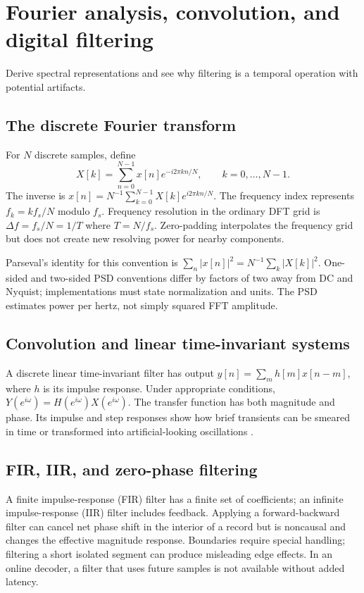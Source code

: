 \chapter{Fourier analysis, convolution, and digital filtering}\label{ch:fourier}
\begin{readergoal}Derive spectral representations and see why filtering is a temporal operation with potential artifacts.\end{readergoal}
\section{The discrete Fourier transform}
For $N$ discrete samples, define
\[X[k]=\sum_{n=0}^{N-1}x[n]e^{-i2\pi kn/N},\qquad k=0,\ldots,N-1.\]
The inverse is $x[n]=N^{-1}\sum_{k=0}^{N-1}X[k]e^{i2\pi kn/N}$. The frequency index represents $f_k=kf_s/N$ modulo $f_s$. Frequency resolution in the ordinary DFT grid is $\Delta f=f_s/N=1/T$ where $T=N/f_s$. Zero-padding interpolates the frequency grid but does not create new resolving power for nearby components.

Parseval's identity for this convention is $\sum_n|x[n]|^2=N^{-1}\sum_k|X[k]|^2$. One-sided and two-sided PSD conventions differ by factors of two away from DC and Nyquist; implementations must state normalization and units. The PSD estimates power per hertz, not simply squared FFT amplitude.

\section{Convolution and linear time-invariant systems}
A discrete linear time-invariant filter has output $y[n]=\sum_m h[m]x[n-m]$, where $h$ is its impulse response. Under appropriate conditions, $Y(e^{i\omega})=H(e^{i\omega})X(e^{i\omega})$. The transfer function has both magnitude and phase. Its impulse and step responses show how brief transients can be smeared in time or transformed into artificial-looking oscillations \cite{CheveigneNelken2019}.

\section{FIR, IIR, and zero-phase filtering}
A finite impulse-response (FIR) filter has a finite set of coefficients; an infinite impulse-response (IIR) filter includes feedback. Applying a forward-backward filter can cancel net phase shift in the interior of a record but is noncausal and changes the effective magnitude response. Boundaries require special handling; filtering a short isolated segment can produce misleading edge effects. In an online decoder, a filter that uses future samples is not available without added latency.

